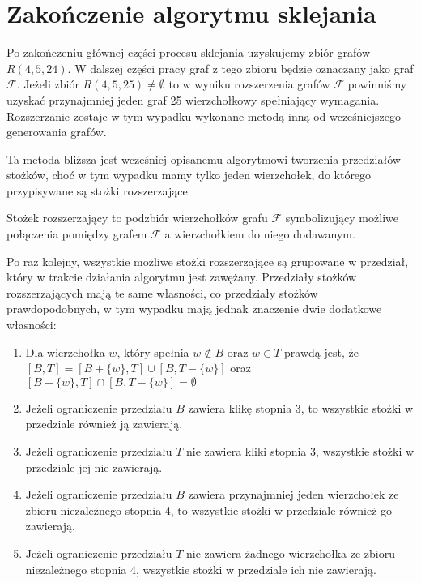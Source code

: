 \section{Zakończenie algorytmu sklejania}

Po zakończeniu głównej części procesu sklejania uzyskujemy zbiór grafów $R(4,5,24)$. W dalszej części pracy graf z tego zbioru będzie oznaczany jako graf $\mathcal{F}$. Jeżeli zbiór $R(4,5,25) \neq \emptyset$ to w wyniku rozszerzenia grafów $\mathcal{F}$ powinniśmy uzyskać przynajmniej jeden graf 25 wierzchołkowy spełniający wymagania. 
Rozszerzanie zostaje w tym wypadku wykonane metodą inną od wcześniejszego generowania grafów.

Ta metoda bliższa jest wcześniej opisanemu algorytmowi tworzenia przedziałów stożków, choć w tym wypadku mamy tylko jeden wierzchołek, do którego przypisywane są stożki rozszerzające.
\begin{definition}
  Stożek rozszerzający to podzbiór wierzchołków grafu $\mathcal{F}$ symbolizujący możliwe połączenia pomiędzy grafem $\mathcal{F}$ a wierzchołkiem do niego dodawanym.
\end{definition}

Po raz kolejny, wszystkie możliwe stożki rozszerzające są grupowane w przedział, który w trakcie działania algorytmu jest zawężany. Przedziały stożków rozszerzających mają te same własności, co przedziały stożków prawdopodobnych, w tym wypadku mają jednak znaczenie dwie dodatkowe własności:

\begin{enumerate}
\item Dla wierzchołka $w$, który spełnia $w \notin B$ oraz $w\in T$ prawdą jest, że $[B, T] = [B + \{ w\}, T] \cup [B , T - \{ w\}]$ oraz $[B +\{ w\}, T] \cap [B , T - \{ w\}] = \emptyset$

\item Jeżeli ograniczenie przedziału $B$ zawiera klikę stopnia 3, to wszystkie stożki w przedziale również ją zawierają. 

\item Jeżeli ograniczenie przedziału $T$ nie zawiera kliki stopnia 3, wszystkie stożki w przedziale jej nie zawierają.

																													  
				 
\item Jeżeli ograniczenie przedziału $B$ zawiera przynajmniej jeden wierzchołek ze zbioru niezależnego stopnia 4, to wszystkie stożki w przedziale również go zawierają. 

\item Jeżeli ograniczenie przedziału $T$ nie zawiera żadnego wierzchołka ze zbioru niezależnego stopnia 4, wszystkie stożki w przedziale ich nie zawierają. 
\end {enumerate}



